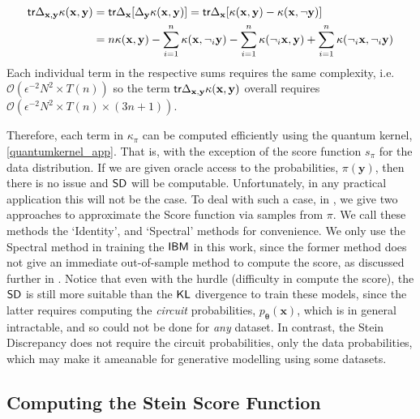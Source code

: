 \begin{align}
    \textsf{tr}\Delta_{\mathbf{x}, \mathbf{y}}\kappa(\mathbf{x}, \mathbf{y}) &= \textsf{tr}\Delta_{\mathbf{x}}[ \Delta_{\mathbf{y}}\kappa(\mathbf{x}, \mathbf{y})] \nonumber = \textsf{tr}\Delta_{\mathbf{x}}[\kappa(\mathbf{x}, \mathbf{y}) - \kappa(\mathbf{x}, \neg\mathbf{y})] \nonumber \\
    &= n\kappa(\mathbf{x}, \mathbf{y}) - \sum\limits_{i=1}^n\kappa(\mathbf{x}, \neg_i\mathbf{y}) - \sum\limits_{i=1}^n\kappa(\neg_i\mathbf{x}, \mathbf{y})\nonumber + \sum\limits_{i=1}^n\kappa(\neg_i\mathbf{x}, \neg_i\mathbf{y})
\end{align}
Each individual term in the respective sums requires the same complexity, i.e.\@ $\mathcal{O}(\epsilon^{-2}N^2 \times T(n))$ so the term $\textsf{tr}\Delta_{\mathbf{x}, \mathbf{y}}\kappa(\mathbf{x}, \mathbf{y})$ overall requires $\mathcal{O}(\epsilon^{-2}N^2 \times T(n)\times (3n+1))$. 

Therefore, each term in $\kappa_\pi$ can be computed efficiently using the quantum kernel, \eqref{quantumkernel_app}. That is, with the exception of the score function $s_\pi$ for the data distribution. If we are given oracle access to the probabilities, $\pi(\mathbf{y})$, then there is no issue and $\operatorname{\textsf{SD}}$ will be computable. Unfortunately, in any practical application this will not be the case. To deal with such a case, in , we give two approaches to approximate the Score function via samples from $\pi$. We call these methods the `Identity', and `Spectral' methods for convenience. We only use the Spectral method in training the $\textsf{IBM}$ in this work, since the former method does not give an immediate out-of-sample method to compute the score, as discussed further in . Notice that even with the hurdle (difficulty in compute the score), the $\operatorname{\textsf{SD}}$ is still more suitable than the $\operatorname{\textsf{KL}}$ divergence to train these models, since the latter requires computing the \textit{circuit} probabilities, $p_{\boldsymbol\theta}(\mathbf{x})$, which is in general intractable, and so could not be done for \textit{any} dataset. In contrast, the Stein Discrepancy does not require the circuit probabilities, only the data probabilities, which may make it ameanable for generative modelling using some datasets.


\subsection{Computing the Stein Score Function} 
\label{supp_matt:steinscoremethod}

